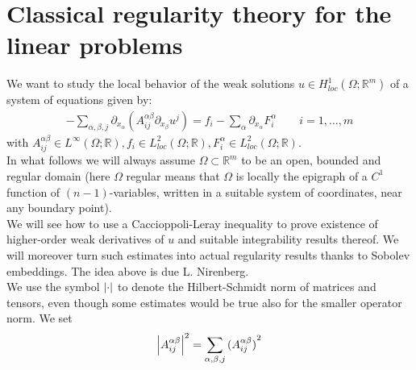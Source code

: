 \section{Classical regularity theory for the linear problems}
We want to study the local behavior of the weak solutions \(u \in H_{loc}^{1}(\Omega; \mathbb{R}^{m})\) of a system of equations given by:
\begin{gather}
    - \sum_{\alpha, \beta, j} \partial_{x_\alpha} (A_{ij}^{\alpha \beta} \partial_{x_{\beta}} u^{j}) = f_{i} - \sum_{\alpha}^{} \partial_{x_{\alpha}} F_{i}^{\alpha}\qquad i=1,\dots,m
\end{gather}
with \(A_{ij}^{\alpha \beta} \in L^{\infty}(\Omega;\mathbb{R}), f_{i}\in L^{2}_{loc}(\Omega;\mathbb{R}), F_{i}^{\alpha}\in L_{loc}^{2}(\Omega;\mathbb{R})\).\\
In what follows we will always assume \(\Omega \subset \mathbb{R}^{m}\) to be an open, bounded and regular domain (here \(\Omega \) regular means that \(\Omega \) is locally the epigraph of a \(C^{1}\) function of \((n-1)\)-variables, written in a suitable system of coordinates, near any boundary point).\\
We will see how to use a Caccioppoli-Leray inequality to prove existence of higher-order weak derivatives of \(u\) and suitable integrability results thereof. We will moreover turn such estimates into actual regularity results thanks to Sobolev embeddings. The idea above is due L. Nirenberg.\\
We use the symbol \(\abs{\cdot}\) to denote the Hilbert-Schmidt norm of matrices and tensors, even though some estimates would be true also for the smaller operator norm.
We set
\begin{gather}
    \abs{A_{ij}^{\alpha \beta}}^{2} = \sum_{\alpha, \beta, j}  {(A_{ij}^{\alpha \beta})}^{2}
\end{gather}


